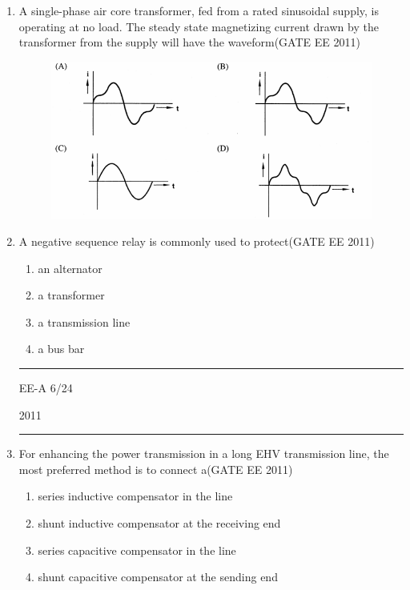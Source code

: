 \documentclass[a4paper,10pt]{exam}
\theoremstyle{remark}
\begin{document}
\begin{enumerate}
\item A single-phase air core transformer, fed from a rated sinusoidal supply, is operating at no load. The steady state magnetizing current drawn by the transformer from the supply will have the waveform\hfill{(GATE EE 2011)}


\begin{figure}[H]
    \centering
    \includegraphics[width=0.8\columnwidth]{figs/Q 18.png}
\end{figure}

\item A negative sequence relay is commonly used to protect\hfill{(GATE EE 2011)}
\begin{multicols}{4}
\begin{enumerate}
    \item an alternator
    \item a transformer
    \item a transmission line
    \item a bus bar
\end{enumerate}
\end{multicols}

\vfill
\noindent\rule{\textwidth}{0.4pt}
\raggedright{EE-A}
\hfill
6/24
\newpage
\raggedright{2011}
\hfill
{}\\

\noindent\rule{\textwidth}{0.4pt}

\item For enhancing the power transmission in a long EHV transmission line, the most preferred method is to connect a\hfill{(GATE EE 2011)}
\begin{enumerate}
  \item series inductive compensator in the line
  \item shunt inductive compensator at the receiving end
  \item series capacitive compensator in the line
  \item shunt capacitive compensator at the sending end
\end{enumerate}


\end{enumerate}
\end{document}
